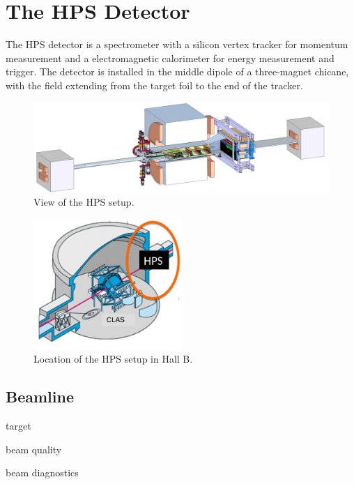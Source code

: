 \chapter{The HPS Detector}

The HPS detector is a spectrometer with a silicon vertex tracker for momentum measurement and a electromagnetic calorimeter for energy measurement and trigger.
The detector is installed in the middle dipole of a three-magnet chicane, with the field extending from the target foil to the end of the tracker.

\begin{figure}[ht]
    \includegraphics[width=\textwidth]{detector/figs/HPS-pic}
    \caption{View of the HPS setup.}
    \label{figure:svt_layout}
\end{figure}

\begin{figure}[ht]
    \begin{center}
    \includegraphics[width=0.5\textwidth]{detector/figs/hallb}
\end{center}
    \caption{Location of the HPS setup in Hall B.}
    \label{figure:svt_layout}
\end{figure}

\section{Beamline}
target

beam quality

beam diagnostics

